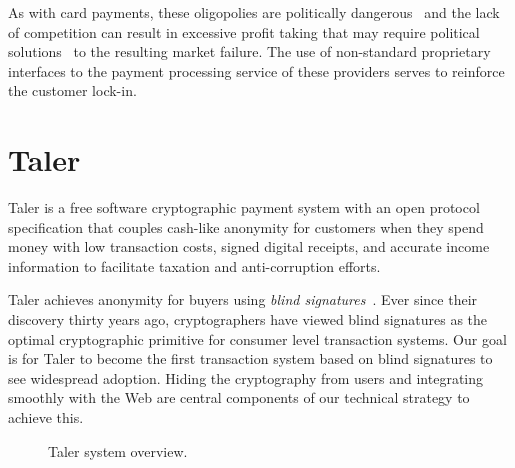 \documentclass{IEEEtran}
\begin{document}
As with card payments, these oligopolies are politically
dangerous~\cite{crinkey2011rundle} and the lack of competition can
result in excessive profit taking that may require political
solutions~\cite{guardian2015cap} to the resulting market failure.  The
use of non-standard proprietary interfaces to the payment processing
service of these providers serves to reinforce the customer lock-in.


\section{Taler}

Taler is a free software cryptographic payment system with an open
protocol specification that couples cash-like anonymity for customers
when they spend money with low transaction costs, signed digital
receipts, and accurate income information to facilitate taxation and
anti-corruption efforts.

Taler achieves anonymity for buyers using {\em blind
signatures}~\cite{chaum1983blind}.  Ever since their discovery thirty
years ago, cryptographers have viewed blind signatures as the optimal
cryptographic primitive for consumer level transaction systems.  Our
goal is for Taler to become the first transaction system based on blind
signatures to see widespread adoption.  Hiding the cryptography from
users and integrating smoothly with the Web are central components of our
technical strategy to achieve this. %


\begin{figure}[b!]
\centering
{}
\caption{Taler system overview.}
\label{fig:system}
\end{figure}
\end{document}
